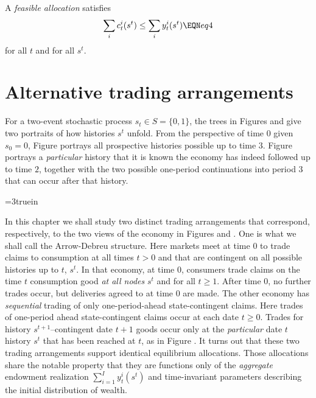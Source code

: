 
A {\it feasible allocation} satisfies
$$\sum_i c_t^i(s^t) \leq \sum_i y_t^i(s^t)  \EQN eq4 $$
for all $t$ and for all $s^t$.


\section{Alternative trading arrangements}
For a two-event stochastic process $s_t \in S = \{0, 1\}$, the
trees in Figures  and  %
 give
two portraits of how histories $s^t$ unfold.  From the
perspective of time $0$ given $s_0=0$, Figure  portrays
all prospective histories possible up to time
$3$. Figure  portrays  a {\it particular\/} history that it is
known the economy has indeed followed up to   time $2$, together
with the  two possible one-period continuations into period $3$
that can occur after that history.


\centerline{\epsfxsize=3truein} \caption{The
Arrow-Debreu commodity space for a two-state Markov chain. At time
$0$, there are trades in time $t=3$ goods for each of the eight
nodes that signify histories that can possibly be reached starting from
the node at time $0$.} 
\endfigure



In this chapter we shall study two distinct trading arrangements
that correspond, respectively,  to the two views of the economy in
Figures  and . %
One is
what we shall call the Arrow-Debreu structure.  Here  markets meet
at time $0$ to  trade claims to consumption at all times $t >0$
and that are contingent on all possible histories up to $t$,
$s^t$. In that economy, at time $0$, consumers trade claims on
the time $t$ consumption good {\it at all nodes\/} $s^t$  and for all $t \geq 1$. After
time $0$, no further trades occur, but deliveries agreed to at time $0$ are made.
     The other economy has {\it sequential\/} trading of
only one-period-ahead state-contingent claims. Here trades of one-period ahead state-contingent claims occur
at each date $t \geq 0$.   Trades for history
$s^{t+1}$--contingent date $t+1$ goods occur only at the {\it
particular\/}   date $t$ history $s^t$ that has been reached at
$t$, as in Figure .   %
 It turns out that  these two trading
arrangements support identical equilibrium allocations. Those
allocations share the notable property that they are  functions only of
the {\it aggregate\/} endowment realization $\sum_{i=1}^I y_t^i(s^t)$ and time-invariant
parameters describing the initial distribution of wealth.







